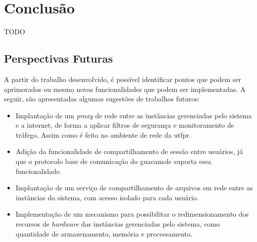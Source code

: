 \chapter{Conclus\~ao}\label{cap:conclusao}

TODO






\section{Perspectivas Futuras}
\label{sec:perspectivasFuturas}

A partir do trabalho desenvolvido, é possível identificar pontos que podem ser aprimorados ou mesmo novas funcionalidades que podem ser implementadas. A seguir, são apresentadas algumas sugestões de trabalhos futuros:

\begin{itemize}
    \item Implantação de um \textit{proxy} de rede entre as instâncias gerenciadas pelo sistema e a internet, de forma a aplicar filtros de segurança e monitoramento de tráfego. Assim como é feito no ambiente de rede da \gls{utfpr}.

    \item Adição da funcionalidade de compartilhamento de sessão entre usuários, já que o protocolo base de comunicação do \gls{guacamole} suporta essa funcionalidade. 

    \item Implantação de um serviço de compartilhamento de arquivos em rede entre as instâncias do sistema, com acesso isolado para cada usuário.

    \item Implementação de um mecanismo para possibilitar o redimensionamento dos recursos de \textit{hardware} das instâncias gerenciadas pelo sistema, como quantidade de armazenamento, memória e processamento.
\end{itemize}